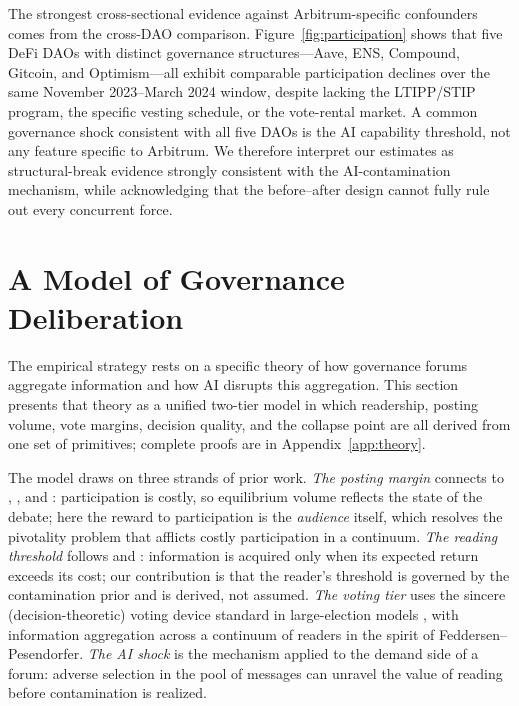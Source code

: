 \documentclass[12pt]{article}
\begin{document}
The strongest cross-sectional evidence against Arbitrum-specific confounders
comes from the cross-DAO comparison. Figure~\ref{fig:participation} shows that
five DeFi DAOs with distinct governance structures---Aave, ENS, Compound, Gitcoin,
and Optimism---all exhibit comparable participation declines over the same
November 2023--March 2024 window, despite lacking the LTIPP/STIP program, the
specific vesting schedule, or the vote-rental market. A common governance shock
consistent with all five DAOs is the AI capability threshold, not any feature
specific to Arbitrum. We therefore interpret our estimates as structural-break
evidence strongly consistent with the AI-contamination mechanism, while
acknowledging that the before--after design cannot fully rule out every
concurrent force.



\section{A Model of Governance Deliberation}
\label{sec:model}

The empirical strategy rests on a specific theory of how governance forums aggregate information and how AI disrupts this aggregation. This section presents that theory as a unified two-tier model in which readership, posting volume, vote margins, decision quality, and the collapse point are all derived from one set of primitives; complete proofs are in Appendix~\ref{app:theory}.

The model draws on three strands of prior work. \emph{The posting margin} connects to \citet{lohmann1994}, \citet{lohmann1993}, and \citet{austensmith1990}: participation is costly, so equilibrium volume reflects the state of the debate; here the reward to participation is the \emph{audience} itself, which resolves the pivotality problem that afflicts costly participation in a continuum. \emph{The reading threshold} follows \citet{grossman1980} and \citet{dewatripont1999}: information is acquired only when its expected return exceeds its cost; our contribution is that the reader's threshold is governed by the contamination prior and is derived, not assumed. \emph{The voting tier} uses the sincere (decision-theoretic) voting device standard in large-election models \citep{feddersen1996,feddersen1997}, with information aggregation across a continuum of readers in the spirit of Feddersen--Pesendorfer. \emph{The AI shock} is the \citet{akerlof1970} mechanism applied to the demand side of a forum: adverse selection in the pool of messages can unravel the value of reading before contamination is realized.
\end{document}
